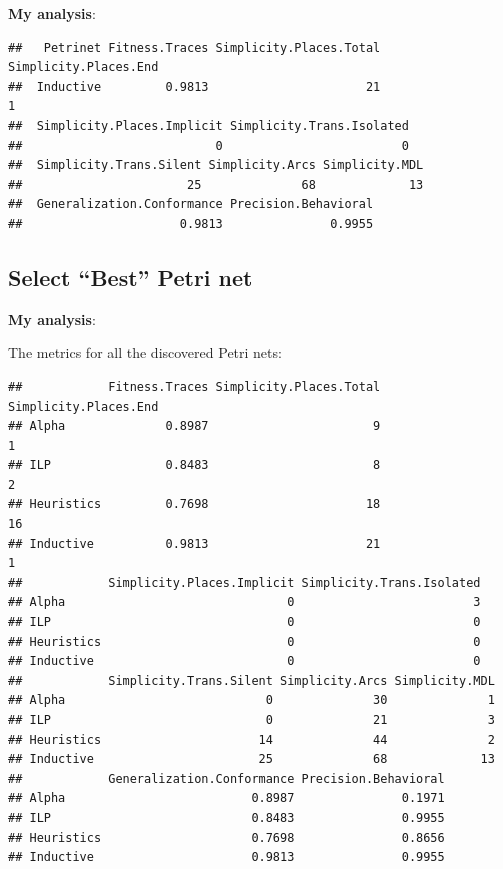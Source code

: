\documentclass[]{article}
\begin{document}
\textbf{My analysis}:

\begin{verbatim}
##   Petrinet Fitness.Traces Simplicity.Places.Total Simplicity.Places.End
##  Inductive         0.9813                      21                     1
##  Simplicity.Places.Implicit Simplicity.Trans.Isolated
##                           0                         0
##  Simplicity.Trans.Silent Simplicity.Arcs Simplicity.MDL
##                       25              68             13
##  Generalization.Conformance Precision.Behavioral
##                      0.9813               0.9955
\end{verbatim}

\subsection{Select ``Best'' Petri net}\label{select-best-petri-net}

\textbf{My analysis}:

The metrics for all the discovered Petri nets:

\begin{verbatim}
##            Fitness.Traces Simplicity.Places.Total Simplicity.Places.End
## Alpha              0.8987                       9                     1
## ILP                0.8483                       8                     2
## Heuristics         0.7698                      18                    16
## Inductive          0.9813                      21                     1
##            Simplicity.Places.Implicit Simplicity.Trans.Isolated
## Alpha                               0                         3
## ILP                                 0                         0
## Heuristics                          0                         0
## Inductive                           0                         0
##            Simplicity.Trans.Silent Simplicity.Arcs Simplicity.MDL
## Alpha                            0              30              1
## ILP                              0              21              3
## Heuristics                      14              44              2
## Inductive                       25              68             13
##            Generalization.Conformance Precision.Behavioral
## Alpha                          0.8987               0.1971
## ILP                            0.8483               0.9955
## Heuristics                     0.7698               0.8656
## Inductive                      0.9813               0.9955
\end{verbatim}
\end{document}

